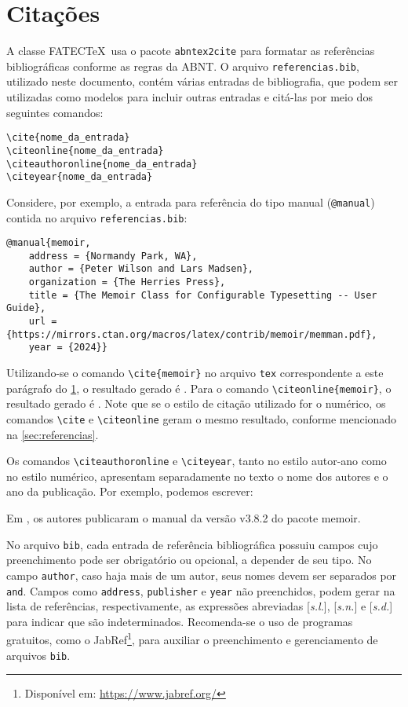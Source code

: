 \chapter{Citações}\label{apd:cit}

A classe FATEC\TeX\ usa o pacote \texttt{abntex2cite} para formatar as referências bibliográficas conforme as regras da ABNT. O arquivo \texttt{referencias.bib}, utilizado neste documento, contém várias entradas de bibliografia, que podem ser utilizadas como modelos para incluir outras entradas e citá-las por meio dos seguintes comandos:
\begin{verbatim}
\cite{nome_da_entrada}
\citeonline{nome_da_entrada}
\citeauthoronline{nome_da_entrada}
\citeyear{nome_da_entrada}
\end{verbatim}

Considere, por exemplo, a entrada para referência do tipo manual (\texttt{@manual}) contida no arquivo \texttt{referencias.bib}:
\begin{verbatim}
@manual{memoir,
    address = {Normandy Park, WA},
    author = {Peter Wilson and Lars Madsen},
    organization = {The Herries Press},
    title = {The Memoir Class for Configurable Typesetting -- User Guide},
    url = {https://mirrors.ctan.org/macros/latex/contrib/memoir/memman.pdf},
    year = {2024}}
\end{verbatim}

Utilizando-se o comando \verb|\cite{memoir}| no arquivo \texttt{tex} correspondente a este parágrafo do \cref{apd:cit}, o resultado gerado é \cite{memoir}. Para o comando \verb|\citeonline{memoir}|, o resultado gerado é . Note que se o estilo de citação utilizado for o numérico, os comandos \verb|\cite| e \verb|\citeonline| geram o mesmo resultado, conforme mencionado na \cref{sec:referencias}.

Os comandos \verb|\citeauthoronline| e \verb|\citeyear|, tanto no estilo autor-ano como no estilo numérico, apresentam separadamente no texto o nome dos autores e o ano da publicação. Por exemplo, podemos escrever:

\begin{mdframed}[style=plainSty,innertopmargin=8pt] %
Em \citeyear{memoir}, os autores  publicaram o manual da versão v3.8.2 do pacote \textsf{memoir}.
\end{mdframed}

No arquivo \texttt{bib}, cada entrada de referência bibliográfica possuiu campos cujo preenchimento pode ser obrigatório ou opcional, a depender de seu tipo. No campo \texttt{author}, caso haja mais de um autor, seus nomes devem ser separados por \texttt{and}. Campos como \texttt{address}, \texttt{publisher} e \texttt{year} não preenchidos, podem gerar na lista de referências, respectivamente, as expressões abreviadas [\emph{s.l.}], [\emph{s.n.}] e [\emph{s.d.}] para indicar que são indeterminados. Recomenda-se o uso de programas gratuitos, como o JabRef\footnote{Disponível em: \url{https://www.jabref.org/}}, para auxiliar o preenchimento e gerenciamento de arquivos \texttt{bib}.

